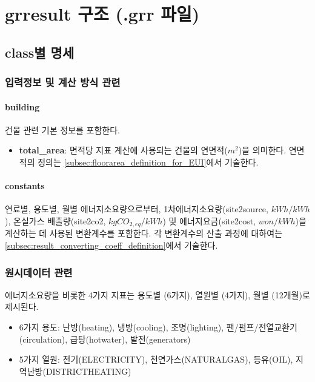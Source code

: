 
\section{grresult 구조 (.grr 파일)}
\subsection{class별 명세}
\subsubsection{입력정보 및 계산 방식 관련}
\paragraph{building} 건물 관련 기본 정보를 포함한다.
\begin{itemize}
  \item \textbf{total\_area}: 면적당 지표 계산에 사용되는 건물의 연면적($m^2$)을 의미한다. 연면적의 정의는 \ref{subsec:floorarea_definition_for_EUI}에서 기술한다.
\end{itemize}

\paragraph{constants} 연료별, 용도별, 월별 에너지소요량으로부터, 1차에너지소요량(site2source, $kWh/kWh$), 온실가스 배출량(site2co2, $kgCO_{2,eq}/kWh$) 및 에너지요금(site2cost, $won/kWh$)을 계산하는 데 사용된 변환계수를 포함한다. 각 변환계수의 산출 과정에 대하여는 \ref{subsec:result_converting_coeff_definition}에서 기술한다.

\subsubsection{원시데이터 관련}
에너지소요량을 비롯한 4가지 지표는 용도별 (6가지), 열원별 (4가지), 월별 (12개월)로 제시된다.
\begin{itemize}
  \item 6가지 용도: 난방(heating), 냉방(cooling), 조명(lighting), 팬/펌프/전열교환기(circulation), 급탕(hotwater), 발전(generators)
  \item 5가지 열원: 전기(ELECTRICITY), 천연가스(NATURALGAS), 등유(OIL), 지역난방(DISTRICTHEATING)
\end{itemize}

